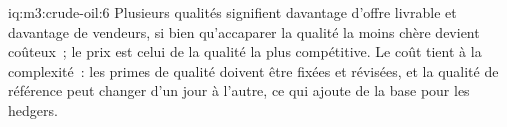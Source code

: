 \begin{solution}{iq:m3:crude-oil:6}
Plusieurs qualités signifient davantage d'offre livrable et davantage de vendeurs, si bien qu'accaparer
la qualité la moins chère devient coûteux~; le prix est celui de la qualité la plus compétitive. Le coût tient
à la complexité~: les primes de qualité doivent être fixées et révisées, et la qualité de référence peut
changer d'un jour à l'autre, ce qui ajoute de la base pour les hedgers.
\end{solution}
